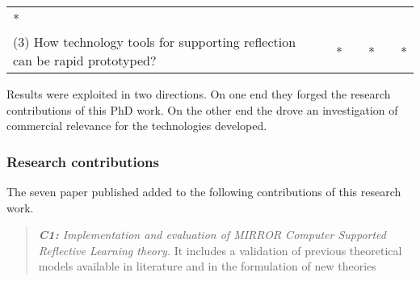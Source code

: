 \begin{longtable}[c]{@{}lccccccc@{}}
\begin{minipage}[t]{0.05\columnwidth}\centering\strut
*
\strut\end{minipage} &
\begin{minipage}[t]{0.05\columnwidth}\centering\strut
\strut\end{minipage}\tabularnewline
\begin{minipage}[t]{0.37\columnwidth}\raggedright\strut
(3) How technology tools for supporting reflection can be rapid
prototyped?
\strut\end{minipage} &
\begin{minipage}[t]{0.05\columnwidth}\centering\strut
\strut\end{minipage} &
\begin{minipage}[t]{0.05\columnwidth}\centering\strut
\strut\end{minipage} &
\begin{minipage}[t]{0.05\columnwidth}\centering\strut
*
\strut\end{minipage} &
\begin{minipage}[t]{0.05\columnwidth}\centering\strut
\strut\end{minipage} &
\begin{minipage}[t]{0.05\columnwidth}\centering\strut
*
\strut\end{minipage} &
\begin{minipage}[t]{0.05\columnwidth}\centering\strut
\strut\end{minipage} &
\begin{minipage}[t]{0.05\columnwidth}\centering\strut
*
\strut\end{minipage}\tabularnewline
\bottomrule
\end{longtable}

Results were exploited in two directions. On one end they forged the
research contributions of this PhD work. On the other end the drove an
investigation of commercial relevance for the technologies developed.

\subsubsection{Research contributions}\label{research-contributions}

The seven paper published added to the following contributions of this
research work.

\begin{quote}
\emph{\textbf{C1:} Implementation and evaluation of MIRROR Computer
Supported Reflective Learning theory.} It includes a validation of
previous theoretical models available in literature and in the
formulation of new theories
\end{quote}

